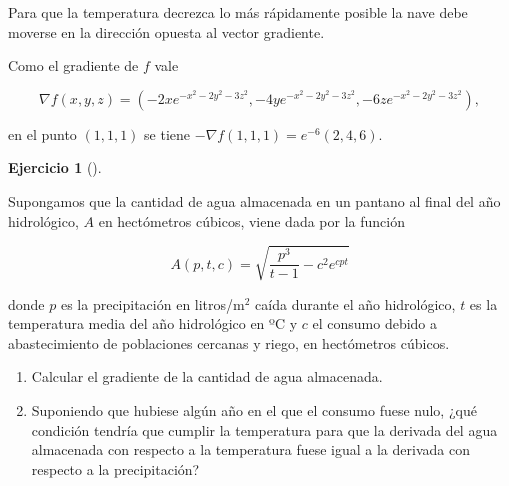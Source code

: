 \documentclass[
  spanish,
  a4paper,
]{scrreport}
\theoremstyle{definition}
\newtheorem{exercise}{Ejercicio}[chapter]
\theoremstyle{remark}
\begin{document}
\begin{tcolorbox}[enhanced jigsaw, arc=.35mm, bottomrule=.15mm, bottomtitle=1mm, breakable, colback=white, colbacktitle=quarto-callout-tip-color!10!white, colframe=quarto-callout-tip-color-frame, coltitle=black, left=2mm, leftrule=.75mm, opacityback=0, opacitybacktitle=0.6, rightrule=.15mm, title=\textcolor{quarto-callout-tip-color}{\faLightbulb}\hspace{0.5em}{Solución}, titlerule=0mm, toprule=.15mm, toptitle=1mm]

Para que la temperatura decrezca lo más rápidamente posible la nave debe
moverse en la dirección opuesta al vector gradiente.

Como el gradiente de \(f\) vale

\[
\nabla f(x,y,z) 
= (-2xe^{-x^2-2y^2-3z^2}, -4ye^{-x^2-2y^2-3z^2}, -6ze^{-x^2-2y^2-3z^2}),
\]

en el punto \((1, 1, 1)\) se tiene \(-\nabla f(1,1,1) = e^{-6}(2,4,6)\).

\end{tcolorbox}

\begin{exercise}[]\protect\hypertarget{exr-pantano}{}\label{exr-pantano}

Supongamos que la cantidad de agua almacenada en un pantano al final del
año hidrológico, \(A\) en hectómetros cúbicos, viene dada por la función

\[
A(p,t,c) = \sqrt {\frac{{p^3 }}{{t - 1}} - c^2 e^{cpt}}
\]

donde \(p\) es la precipitación en litros/m\(^2\) caí\-da durante el año
hidrológico, \(t\) es la temperatura media del año hidrológico en ºC y
\(c\) el consumo debido a abastecimiento de poblaciones cercanas y
riego, en hectómetros cúbicos.

\begin{enumerate}
\def\labelenumi{\alph{enumi}.}
\item
  Calcular el gradiente de la cantidad de agua almacenada.
\item
  Suponiendo que hubiese algún año en el que el consumo fuese nulo, ¿qué
  condición tendría\- que cumplir la temperatura para que la derivada
  del agua almacenada con respecto a la temperatura fuese igual a la
  derivada con respecto a la precipitación?
\end{enumerate}

\end{exercise}
\end{document}
